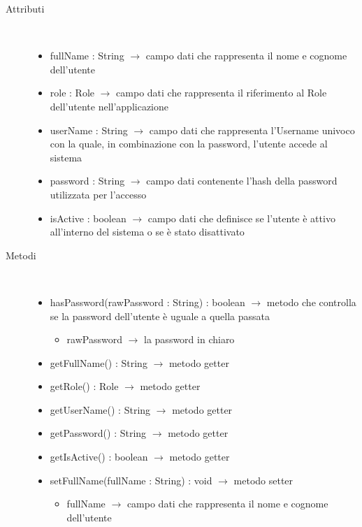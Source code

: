 \begin{description}
\item[Attributi] \hfill \\
\vspace{-7mm}
\begin{itemize}
	\item fullName : String $\rightarrow$ campo dati che rappresenta il nome e cognome dell'utente
	\item role : Role $\rightarrow$ campo dati che rappresenta il riferimento al Role dell'utente nell'applicazione
	\item userName : String $\rightarrow$ campo dati che rappresenta l'Username univoco con la quale, in combinazione con la password, l'utente accede al sistema
	\item password : String $\rightarrow$ campo dati contenente l'hash della password utilizzata per l'accesso
	\item isActive : boolean $\rightarrow$ campo dati che definisce se l'utente è attivo all'interno del sistema o se è stato disattivato
\end{itemize}

\item[Metodi] \hfill \\
\vspace{-7mm}
\begin{itemize}
	\item hasPassword(rawPassword : String) : boolean $\rightarrow$ metodo che controlla se la password dell'utente è uguale a quella passata\begin{itemize}
		\item rawPassword $\rightarrow$ la password in chiaro
	\end{itemize}
	
	\item getFullName() : String $\rightarrow$ metodo getter
	\item getRole() : Role $\rightarrow$ metodo getter
	\item getUserName() : String $\rightarrow$ metodo getter
	\item getPassword() : String $\rightarrow$ metodo getter
	\item getIsActive() : boolean $\rightarrow$ metodo getter
	\item setFullName(fullName : String) : void $\rightarrow$ metodo setter\begin{itemize}
		\item fullName $\rightarrow$ campo dati che rappresenta il nome e cognome dell'utente
	\end{itemize}
	

\end{itemize}
\end{description}
